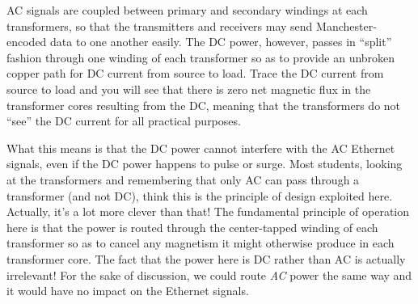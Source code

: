 AC signals are coupled between primary and secondary windings at each transformers, so that the transmitters and receivers may send Manchester-encoded data to one another easily.  The DC power, however, passes in ``split'' fashion through one winding of each transformer so as to provide an unbroken copper path for DC current from source to load.  Trace the DC current from source to load and you will see that there is zero net magnetic flux in the transformer cores resulting from the DC, meaning that the transformers do not ``see'' the DC current for all practical purposes.

\vskip 10pt

What this means is that the DC power cannot interfere with the AC Ethernet signals, even if the DC power happens to pulse or surge.  Most students, looking at the transformers and remembering that only AC can pass through a transformer (and not DC), think this is the principle of design exploited here.  Actually, it's a lot more clever than that!  The fundamental principle of operation here is that the power is routed through the center-tapped winding of each transformer so as to cancel any magnetism it might otherwise produce in each transformer core.  The fact that the power here is DC rather than AC is actually irrelevant!  For the sake of discussion, we could route {\it AC} power the same way and it would have no impact on the Ethernet signals.






